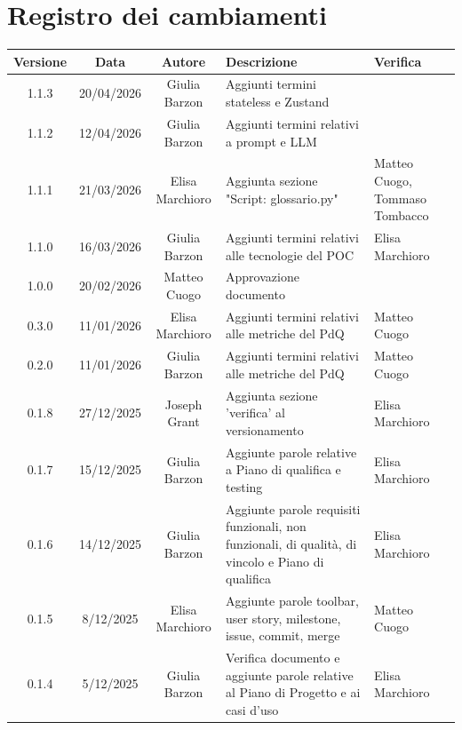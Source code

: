 \documentclass[11pt,a4paper]{article}
\begin{document}
\section*{Registro dei cambiamenti}

\begin{table}[H]
    \centering
    \begin{tabular}{|c|c|c|>{\raggedright\arraybackslash}p{}|p{}|}
        \hline
        \textbf{Versione} & \textbf{Data} & \textbf{Autore} & \textbf{Descrizione} & \textbf{Verifica} \\
        \hline
        1.1.3 & 20/04/2026 & Giulia Barzon & Aggiunti termini stateless e Zustand & \\
        \hline
        1.1.2 & 12/04/2026 & Giulia Barzon & Aggiunti termini relativi a prompt e LLM & \\
        \hline
        1.1.1 & 21/03/2026 & Elisa Marchioro & Aggiunta sezione "Script: glossario.py" & Matteo Cuogo, Tommaso Tombacco\\
        \hline
        1.1.0 & 16/03/2026 & Giulia Barzon & Aggiunti termini relativi alle tecnologie del POC & Elisa Marchioro\\
        \hline
        1.0.0 & 20/02/2026 & Matteo Cuogo & Approvazione documento & \\
        \hline
        0.3.0 & 11/01/2026 & Elisa Marchioro & Aggiunti termini relativi alle metriche del PdQ & Matteo Cuogo \\
        \hline
        0.2.0 & 11/01/2026 & Giulia Barzon & Aggiunti termini relativi alle metriche del PdQ &  Matteo Cuogo\\
        \hline
        0.1.8 & 27/12/2025 & Joseph Grant & Aggiunta sezione 'verifica' al versionamento & Elisa Marchioro\\
        \hline
        0.1.7 & 15/12/2025 & Giulia Barzon & Aggiunte parole relative a Piano di qualifica e testing & Elisa Marchioro\\
        \hline
        0.1.6 & 14/12/2025 & Giulia Barzon & Aggiunte parole requisiti funzionali, non funzionali, di qualità, di vincolo e Piano di qualifica & Elisa Marchioro\\
        \hline
        0.1.5 & 8/12/2025 & Elisa Marchioro & Aggiunte parole toolbar, user story, milestone, issue, commit, merge & Matteo Cuogo\\
        \hline
        0.1.4 & 5/12/2025 & Giulia Barzon & Verifica documento e aggiunte parole relative al Piano di Progetto e ai casi d'uso & Elisa Marchioro\\

\end{tabular}
\end{table}
\end{document}
